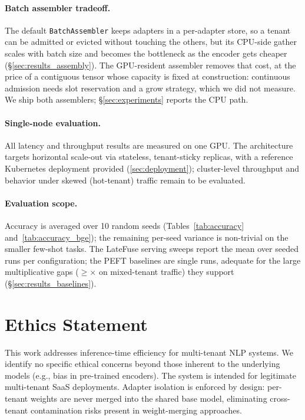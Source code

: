 \documentclass[11pt]{article}
\newcommand{\sysname}{LateFuse}
\newcommand{\eg}{e.g.,\xspace}
\begin{document}
\paragraph{Batch assembler tradeoff.} The default
\texttt{BatchAssembler} keeps adapters in a per-adapter store, so a tenant can
be admitted or evicted without touching the others, but its CPU-side gather
scales with batch size and becomes the bottleneck as the encoder gets cheaper
(\S\ref{sec:results_assembly}). The GPU-resident assembler removes that cost, at
the price of a contiguous tensor whose capacity is fixed at construction:
continuous admission needs slot reservation and a grow strategy, which we did
not measure. We ship both assemblers; \S\ref{sec:experiments} reports the CPU
path.

\paragraph{Single-node evaluation.}
All latency and throughput results are measured on one GPU. The architecture
targets horizontal scale-out via stateless, tenant-sticky replicas, with a
reference Kubernetes deployment provided (\ref{sec:deployment});
cluster-level throughput and behavior under skewed (hot-tenant) traffic remain
to be evaluated.

\paragraph{Evaluation scope.}
Accuracy is averaged over 10 random seeds (Tables~\ref{tab:accuracy}
and~\ref{tab:accuracy_bge}); the
remaining per-seed variance is non-trivial on the smaller few-shot tasks. The
\sysname{} serving sweeps report the mean over \SweepNumSeeds{} seeded runs
per configuration; the PEFT baselines are single runs, adequate for the large
multiplicative gaps ($\geq$\SpeedupMixedMin$\times$ on mixed-tenant traffic)
they support (\S\ref{sec:results_baselines}).

\section*{Ethics Statement}

This work addresses inference-time efficiency for multi-tenant NLP systems.
We identify no specific ethical concerns beyond those inherent to the
underlying models (\eg bias in pre-trained encoders).
The system is intended for legitimate multi-tenant SaaS deployments.
Adapter isolation is enforced by design: per-tenant weights are never merged
into the shared base model, eliminating cross-tenant contamination risks
present in weight-merging approaches.
\end{document}
